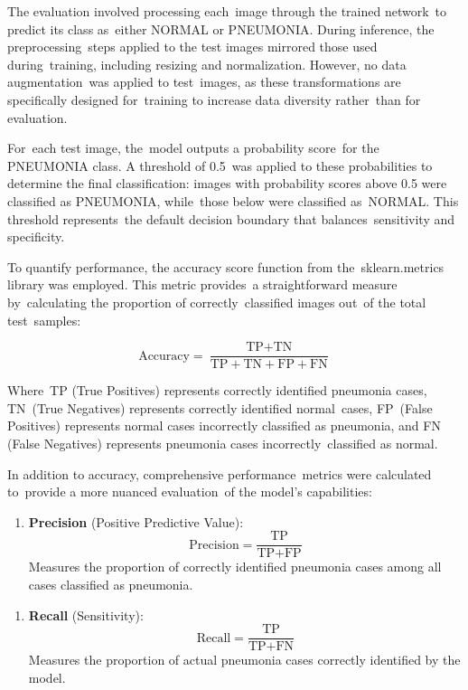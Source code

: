 \documentclass[
  twocolumn,
  10pt,
  a4paper,
  journal
]{IEEEtran}
\begin{document}
The evaluation involved processing each~image through the trained
network~to predict its class as~either NORMAL or PNEUMONIA. During
inference, the preprocessing~steps applied to the test images mirrored
those used during~training, including resizing and normalization.
However, no data augmentation~was applied to test~images, as these
transformations are specifically designed for~training to increase data
diversity rather~than for evaluation.

For~each test image, the~model outputs a probability score~for the
PNEUMONIA class. A threshold of 0.5~was applied to these probabilities
to determine the final classification: images with probability scores
above 0.5 were classified as PNEUMONIA, while~those below were
classified as~NORMAL. This threshold represents~the default decision
boundary that balances~sensitivity and specificity.

To quantify performance, the accuracy score function from
the~sklearn.metrics library was employed. This metric provides~a
straightforward measure by~calculating the proportion of
correctly~classified images out~of the total test~samples:

\begin{equation}
\text{Accuracy} = \frac{\text{TP} + \text{TN}}{\text{TP} + \text{TN} + \text{FP} + \text{FN}}
\end{equation}

Where~TP (True Positives) represents correctly identified pneumonia
cases, TN~(True Negatives) represents correctly identified normal~cases,
FP~(False Positives) represents normal cases incorrectly classified as
pneumonia, and FN (False Negatives) represents pneumonia cases
incorrectly~classified as normal.

In addition to accuracy, comprehensive performance~metrics were
calculated to~provide a more nuanced evaluation~of the
model's capabilities:

\begin{enumerate}
\def\labelenumi{\arabic{enumi}.}
\item
  \textbf{Precision} (Positive Predictive Value): 
  \begin{equation}
  \text{Precision} = \frac{\text{TP}}{\text{TP} + \text{FP}}
  \end{equation}
  Measures the proportion of correctly identified pneumonia cases among all cases classified as pneumonia.
\end{enumerate}

\begin{enumerate}
\def\labelenumi{\arabic{enumi}.}
\setcounter{enumi}{1}
\item
  \textbf{Recall} (Sensitivity): 
  \begin{equation}
  \text{Recall} = \frac{\text{TP}}{\text{TP} + \text{FN}}
  \end{equation}
  Measures the proportion of actual pneumonia cases correctly identified by the model.
\end{enumerate}
\end{document}
